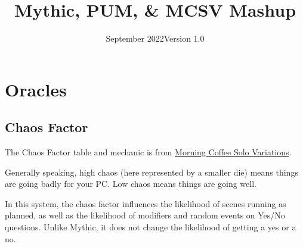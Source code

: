 \usepackage[english]{babel}
\usepackage[utf8]{inputenc}
\usepackage[singlelinecheck=false]{caption}
\usepackage{listings}
\usepackage{shortvrb}
\usepackage{stfloats}
\usepackage{hyperref}


\MakeShortVerb{|}


\title{Mythic, PUM, \& MCSV Mashup}
\date{September 2022\newline{}Version 1.0}



\mainmatter
\section{Oracles}
\subsection{Chaos Factor}
The Chaos Factor table and mechanic is from
\href{https://aleaiactandaest.blogspot.com/p/downloads.html}{Morning Coffee Solo
Variations}.

Generally speaking, high chaos (here represented by a smaller die) means things
are going badly for your PC. Low chaos means things are going well.

In this system, the chaos factor influences the likelihood of scenes running as
planned, as well as the likelihood of modifiers and random events on Yes/No
questions. Unlike Mythic, it does not change the likelihood of getting a yes or a no.


